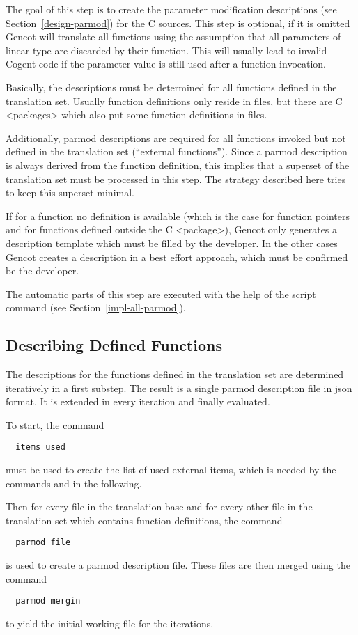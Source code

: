 The goal of this step is to create the parameter modification descriptions (see Section~\ref{design-parmod})
for the C sources. This step is optional, if it is omitted Gencot will translate all functions using the 
assumption that all parameters of linear type are discarded by their function. This will usually lead to
invalid Cogent code if the parameter value is still used after a function invocation.

Basically, the descriptions must be determined for all functions defined in the translation
set. Usually function definitions only reside in  files, but there are C <packages> which also put 
some function definitions in  files.

Additionally, parmod descriptions are required for all functions invoked but not defined in
the translation set (``external functions''). Since a parmod description is always derived from the function 
definition, this implies that a superset of the translation set must be processed in this step. The strategy 
described here tries to keep this superset minimal. 

If for a function no definition is available (which is the case for function pointers and for functions
defined outside the C <package>), Gencot only generates a description template which must be filled by the
developer. In the other cases Gencot creates a description in a best effort approach, which must be confirmed
be the developer.

The automatic parts of this step are executed with the help of the script command  (see 
Section~\ref{impl-all-parmod}).

\subsection{Describing Defined Functions}
\label{app-parmod-defined}

The descriptions for the functions defined in the translation set are determined iteratively in a first substep. 
The result is a single parmod description file in json format. It is extended in every iteration and finally
evaluated.

To start, the command
\begin{verbatim}
  items used
\end{verbatim}
must be used to create the list of used external items, which is needed by the commands 
and  in the following.

Then for every file in the translation base and for every other file in the translation set which contains
function definitions, the command
\begin{verbatim}
  parmod file
\end{verbatim}
is used to create a parmod description file. These files are then merged using the command
\begin{verbatim}
  parmod mergin
\end{verbatim}
to yield the initial working file for the iterations. 

